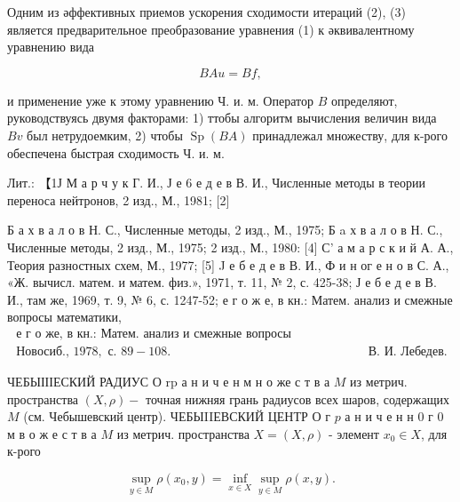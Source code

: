 \documentclass[10pt]{article}
\begin{document}
Одним из әффективных приемов ускорения сходимости итераций (2), (3) является предварительное преобразование уравнения (1) к әквивалентному уравнению вида



\[

B A u=B f,

\]



и применение уже к этому уравнению Ч. и. м. Оператор $B$ определяют, руководствуясь двумя факторами: 1) ттобы алгоритм вычисления величин вида $B v$ был нетрудоемким, 2) чтобы $\operatorname{Sp}(B A)$ принадлежал множеству, для к-рого обеспечена быстрая сходимость Ч. и. м.



Лит.: 【1Ј М а р ч у к Г. И., Ј е 6 е д е в В. И., Численные методы в теории переноса нейтронов, 2 изд., М., 1981; [2]

Б а х в а л о в Н. С., Численные методы, 2 изд., М., 1975; Б a х в а л о в Н. С., Численные методы, 2 изд., М., 1975; 2 изд., М., 1980: [4] С' а м а р с к и й А. А., Теория разностных схем, М., 1977; [5] J е б е д е в В. И., Ф и н ог е н о в С. А., «Ж. вычисл. матем. и матем. физ.», 1971, т. 11, № 2, с. 425-38; Ј е б е д е в В. И., там же, 1969, т. 9, № 6, с. 1247-52; е г о ж е, в кн.: Матем. анализ и смежные вопросы математики, $\begin{array}{ll}\text { е г о же, в кн.: Матем. анализ и смежные вопросы математики, } \\ \text { Новосиб., } 1978, \text { с. } 89-108 . & \text { В. И. Лебедев. }\end{array}$



ЧЕБЫІІІЕСКИЙ РАДИУС О $\mathrm{r} \mathrm{p}$ а н и ч е н м н о же с т в а $M$ из метрич. пространства $(X, \rho)-$ точная нижняя грань радиусов всех шаров, содержащих $M$ (см. Чебышевский центр). ЧЕБЫIIЕВСКИЙ ЦЕНТР О г $p$ а н и ч е н н 0 г 0 м в о ж е с т в а $M$ из метрич. пространства $X=(X, \rho)$ - элемент $x_{0} \in X$, для к-рого



\[

\sup _{y \in M} \rho\left(x_{0}, y\right)=\inf _{x \in X} \sup _{y \in M} \rho(x, y) .

\]
\end{document}
